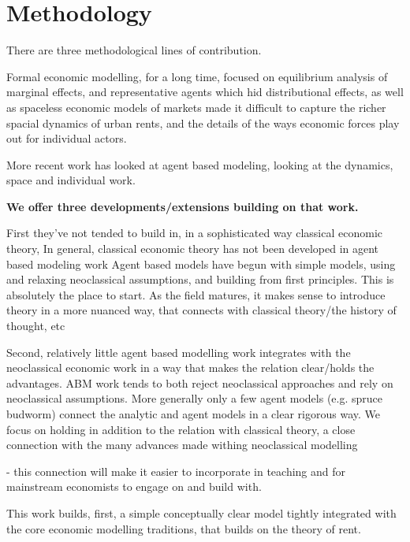 \chapter{Methodology} \label{chapter-methodology}

There are three methodological lines of contribution.

Formal economic modelling, for a long time, focused on equilibrium analysis of marginal effects, and representative agents which hid distributional effects, as well as spaceless economic models of markets made it difficult to capture the richer spacial dynamics of urban rents, and the details of the ways economic forces play out for individual actors.

More recent work has looked at agent based modeling, looking at the dynamics, space and individual work. 

\textbf{We offer three developments/extensions building on that work.}


First they've not tended to build in, in a sophisticated way classical economic theory,
In general, classical economic theory has not been developed in agent based modeling work
Agent based models have begun with simple models, using and relaxing neoclassical assumptions, and building from first principles. This is absolutely the place to start. As the field matures, it makes sense to introduce theory in a more nuanced way, that connects with classical theory/the history of thought, etc

Second, relatively little agent based modelling work integrates with the neoclassical economic work in a way that makes the relation clear/holds the advantages. ABM work tends to both reject neoclassical approaches and rely on neoclassical assumptions.
More generally only a few agent models (e.g. spruce budworm) connect the analytic and agent models in a clear rigorous way. We focus on holding in addition to the relation with classical theory, a close connection with the many advances made withing neoclassical modelling

- this connection will make it easier to incorporate in teaching and for mainstream economists to engage on and build with.


This work builds, first, a simple conceptually clear model tightly integrated with the core economic modelling traditions, that builds on the theory of rent.


